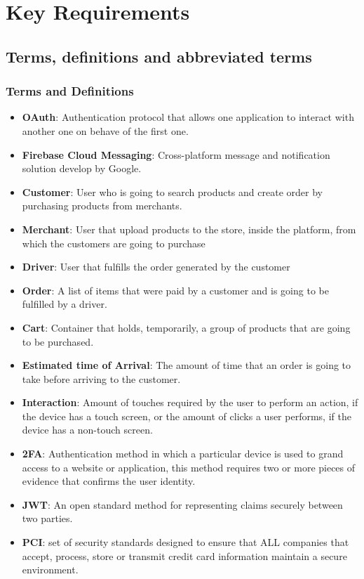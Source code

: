 \section{Key Requirements}
\subsection{Terms, definitions and abbreviated terms}
\subsubsection{Terms and Definitions}
\begin{itemize}
    \item \textbf{OAuth}: Authentication protocol that allows one application 
    to interact with another one on behave of the first one.
    \item \textbf{Firebase Cloud Messaging}: Cross-platform message and 
    notification solution develop by Google.
    \item \textbf{Customer}: User who is going to search products and create 
    order by purchasing products from merchants.
    \item \textbf{Merchant}: User that upload products to the store, 
    inside the platform, from which the customers are going to purchase 
    \item \textbf{Driver}: User that fulfills the order generated by the 
    customer 
    \item \textbf{Order}: A list of items that were paid by a customer and 
    is going to be fulfilled by a driver.
    \item \textbf{Cart}: Container that holds, temporarily, a group of products 
    that are going to be purchased.
    \item \textbf{Estimated time of Arrival}: The amount of time that 
    an order is going to take before arriving to the customer.
    \item \textbf{Interaction}: Amount of touches required by the user to 
    perform an action, if the device has a touch screen, or the amount of 
    clicks a user performs, if the device has a non-touch screen.
    \item \textbf{2FA}: Authentication method in which a particular device is 
    used to grand access to a website or application, this method requires 
    two or more pieces of evidence that confirms the user identity.
    \item \textbf{JWT}: An open standard method for representing claims 
    securely between two parties.
    \item \textbf{PCI}: set of security standards designed to ensure that ALL 
    companies that accept, process, store or transmit credit card 
    information maintain a secure environment. \cite{pci}
\end{itemize}
\pagebreak

